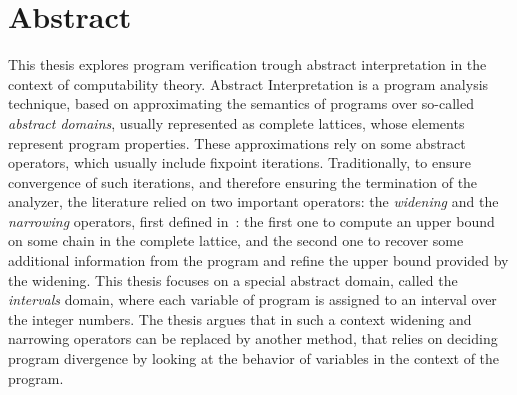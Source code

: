 {}
\begingroup

\chapter*{Abstract}
This thesis explores program verification trough abstract
interpretation in the context of computability theory. Abstract
Interpretation is a program analysis technique, based on approximating
the semantics of programs over so-called \emph{abstract domains},
usually represented as complete lattices, whose elements represent
program properties. These approximations rely on some abstract
operators, which usually include fixpoint iterations. Traditionally,
to ensure convergence of such iterations, and therefore ensuring the
termination of the analyzer, the literature relied on two important
operators: the \emph{widening} and the \emph{narrowing} operators,
first defined in~\cite{patrickradhia:one}: the first one to compute an
upper bound on some chain in the complete lattice, and the second one
to recover some additional information from the program and refine the
upper bound provided by the widening. This thesis focuses on a special
abstract domain, called the \emph{intervals} domain, where each
variable of program is assigned to an interval over the integer
numbers. The thesis argues that in such a context widening and
narrowing operators can be replaced by another method, that relies on
deciding program divergence by looking at the behavior of variables in
the context of the program.

\endgroup

\vfill
